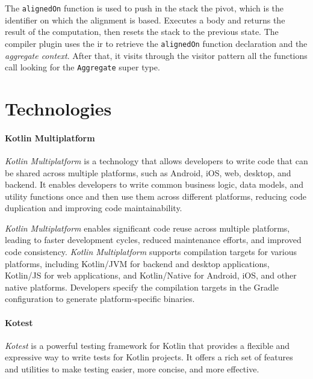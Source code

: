 The \texttt{alignedOn} function is used to push in the stack the pivot, which is the identifier on which the alignment is based.
Executes a body and returns the result of the computation, then resets the stack to the previous state.
The compiler plugin uses the \ac{ir} to retrieve the \texttt{alignedOn} function declaration and the \emph{aggregate context}.
After that, it visits through the visitor pattern all the functions call looking for the \texttt{Aggregate} super type.



\section{Technologies}
\label{sec:technologies}

\paragraph{Kotlin Multiplatform}
\label{par:kotlin-multiplatform}

\emph{Kotlin Multiplatform} is a technology that allows developers to write code that can be shared across multiple platforms,
such as Android, iOS, web, desktop, and backend.
It enables developers to write common business logic, data models, and utility functions once and then use them across
different platforms, reducing code duplication and improving code maintainability.

\emph{Kotlin Multiplatform} enables significant code reuse across multiple platforms, leading to faster development cycles,
reduced maintenance efforts, and improved code consistency.
\emph{Kotlin Multiplatform} supports compilation targets for various platforms, including Kotlin/JVM for backend and desktop applications,
Kotlin/JS for web applications, and Kotlin/Native for Android, iOS, and other native platforms.
Developers specify the compilation targets in the Gradle configuration to generate platform-specific binaries.

\paragraph{Kotest}
\emph{Kotest} is a powerful testing framework for Kotlin that provides a flexible and expressive way to write tests for Kotlin projects.
It offers a rich set of features and utilities to make testing easier, more concise, and more effective.

